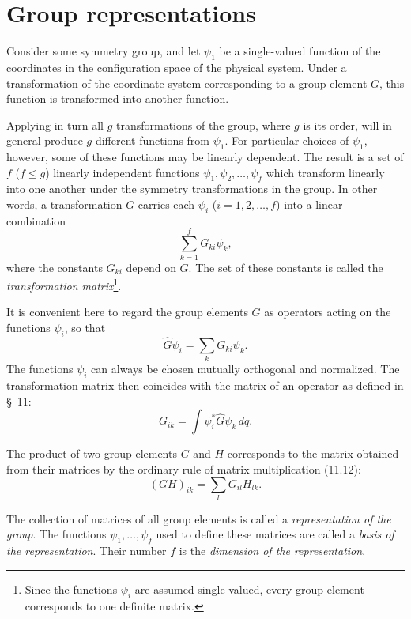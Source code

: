 \section{Group representations}

Consider some symmetry group, and let $\psi_1$ be a single-valued function of the coordinates in the configuration space of the physical system. Under a transformation of the coordinate system corresponding to a group element $G$, this function is transformed into another function.

Applying in turn all $g$ transformations of the group, where $g$ is its order, will in general produce $g$ different functions from $\psi_1$. For particular choices of $\psi_1$, however, some of these functions may be linearly dependent. The result is a set of $f$ ($f\leqslant g$) linearly independent functions $\psi_1,\psi_2,\ldots,\psi_f$ which transform linearly into one another under the symmetry transformations in the group. In other words, a transformation $G$ carries each $\psi_i$ ($i=1,2,\ldots,f$) into a linear combination
\[
 \sum_{k=1}^f G_{ki}\psi_k,
\]
where the constants $G_{ki}$ depend on $G$. The set of these constants is called the \emph{transformation matrix}\footnote{Since the functions $\psi_i$ are assumed single-valued, every group element corresponds to one definite matrix.}.

It is convenient here to regard the group elements $G$ as operators acting on the functions $\psi_i$, so that
\begin{equation}
 \widehat G\psi_i=\sum_kG_{ki}\psi_k.
 \tag{94.1}
\end{equation}
The functions $\psi_i$ can always be chosen mutually orthogonal and normalized. The transformation matrix then coincides with the matrix of an operator as defined in \S~11:
\begin{equation}
 G_{ik}=\int\psi_i^*\widehat G\psi_k\,dq.
 \tag{94.2}
\end{equation}

The product of two group elements $G$ and $H$ corresponds to the matrix obtained from their matrices by the ordinary rule of matrix multiplication (11.12):
\begin{equation}
 (GH)_{ik}=\sum_lG_{il}H_{lk}.
 \tag{94.3}
\end{equation}

The collection of matrices of all group elements is called a \emph{representation of the group}. The functions $\psi_1,\ldots,\psi_f$ used to define these matrices are called a \emph{basis of the representation}. Their number $f$ is the \emph{dimension of the representation}.

